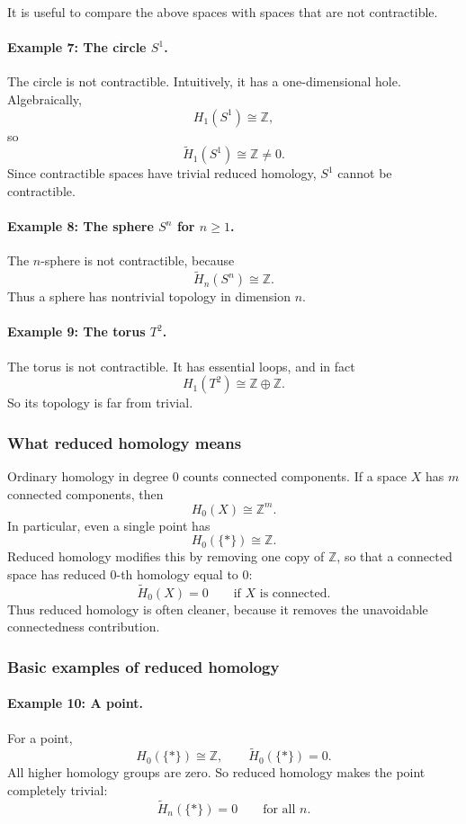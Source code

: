 \documentclass[12pt,a4paper]{article}
\theoremstyle{notespace}
\begin{document}
It is useful to compare the above spaces with spaces that are not contractible.

\paragraph{Example 7: The circle \(S^1\).}
The circle is not contractible. Intuitively, it has a one-dimensional hole. Algebraically,
\[
H_1(S^1)\cong \mathbb{Z},
\]
so
\[
\widetilde{H}_1(S^1)\cong \mathbb{Z}\neq 0.
\]
Since contractible spaces have trivial reduced homology, \(S^1\) cannot be contractible.

\paragraph{Example 8: The sphere \(S^n\) for \(n\ge 1\).}
The \(n\)-sphere is not contractible, because
\[
\widetilde{H}_n(S^n)\cong \mathbb{Z}.
\]
Thus a sphere has nontrivial topology in dimension \(n\).

\paragraph{Example 9: The torus \(T^2\).}
The torus is not contractible. It has essential loops, and in fact
\[
H_1(T^2)\cong \mathbb{Z}\oplus \mathbb{Z}.
\]
So its topology is far from trivial.

\subsubsection{What reduced homology means}

Ordinary homology in degree \(0\) counts connected components. If a space \(X\) has \(m\) connected components, then
\[
H_0(X)\cong \mathbb{Z}^m.
\]
In particular, even a single point has
\[
H_0(\{*\})\cong \mathbb{Z}.
\]
Reduced homology modifies this by removing one copy of \(\mathbb{Z}\), so that a connected space has reduced \(0\)-th homology equal to \(0\):
\[
\widetilde{H}_0(X)=0 \qquad \text{if } X \text{ is connected}.
\]
Thus reduced homology is often cleaner, because it removes the unavoidable connectedness contribution.

\subsubsection{Basic examples of reduced homology}

\paragraph{Example 10: A point.}
For a point,
\[
H_0(\{*\})\cong \mathbb{Z},
\qquad
\widetilde{H}_0(\{*\})=0.
\]
All higher homology groups are zero. So reduced homology makes the point completely trivial:
\[
\widetilde{H}_n(\{*\})=0 \qquad \text{for all } n.
\]
\end{document}
